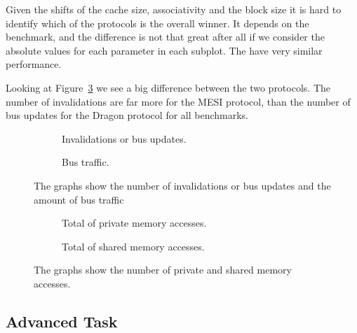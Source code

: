 Given the shifts of the cache size, associativity and the block size it is hard to
identify which of the protocols is the overall winner. It depends on the benchmark,
and the difference is not that great after all if we consider the absolute values
for each parameter in each subplot. The have very similar performance.

Looking at Figure~\ref{fig:inv_bus} we see a big difference between the two protocols.
The number of invalidations are far more for the MESI protocol, than the number of bus
updates for the Dragon protocol for all benchmarks.



\begin{figure}[H]
    \centering
    \begin{subfigure}[b]{0.5\textwidth}
        \centering
        \caption{Invalidations or bus updates.}\label{fig:invalidations}
    \end{subfigure}%
    \hfill
    \begin{subfigure}[b]{0.5\textwidth}
        \centering
        \caption{Bus traffic.}\label{fig:bus_traffic}
    \end{subfigure}%
    \hfill
    \caption{The graphs show the number of invalidations or bus updates and the amount of bus traffic}\label{fig:inv_bus}
\end{figure}

\begin{figure}[H]
    \centering
    \begin{subfigure}[b]{0.5\textwidth}
        \centering
        \caption{Total of private memory accesses.}\label{fig:total_private_accesses}
    \end{subfigure}%
    \hfill
    \begin{subfigure}[b]{0.5\textwidth}
        \centering
        \caption{Total of shared memory accesses.}\label{fig:total_shared_accesses}
    \end{subfigure}%
    \hfill
    \caption{The graphs show the number of private and shared memory accesses.}\label{fig:accesses}
\end{figure}




\subsection{Advanced Task}\label{results:advanced}

